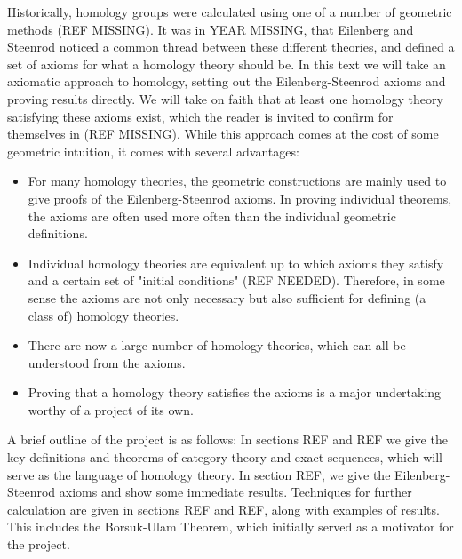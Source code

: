 Historically, homology groups were calculated using one of a number of geometric methods (REF MISSING). It was in YEAR MISSING, that Eilenberg and Steenrod noticed a common thread between these different theories, and defined a set of axioms for what a homology theory should be. In this text we will take an axiomatic approach to homology, setting out the Eilenberg-Steenrod axioms and proving results directly. We will take on faith that at least one homology theory satisfying these axioms exist, which the reader is invited to confirm for themselves in (REF MISSING). While this approach comes at the cost of some geometric intuition, it comes with several advantages:
\begin{itemize}
\item For many homology theories, the geometric constructions are mainly used to give proofs of the Eilenberg-Steenrod axioms. In proving individual theorems, the axioms are often used more often than the individual geometric definitions.
\item Individual homology theories are equivalent up to which axioms they satisfy and a certain set of "initial conditions" (REF NEEDED). Therefore, in some sense the axioms are not only necessary but also sufficient for defining (a class of) homology theories.
\item There are now a large number of homology theories, which can all be understood from the axioms.
\item Proving that a homology theory satisfies the axioms is a major undertaking worthy of a project of its own.
\end{itemize}

A brief outline of the project is as follows: In sections REF and REF we give the key definitions and theorems of category theory and exact sequences, which will serve as the language of homology theory. In section REF, we give the Eilenberg-Steenrod axioms and show some immediate results. Techniques for further calculation are given in sections REF and REF, along with examples of results. This includes the Borsuk-Ulam Theorem, which initially served as a motivator for the project.